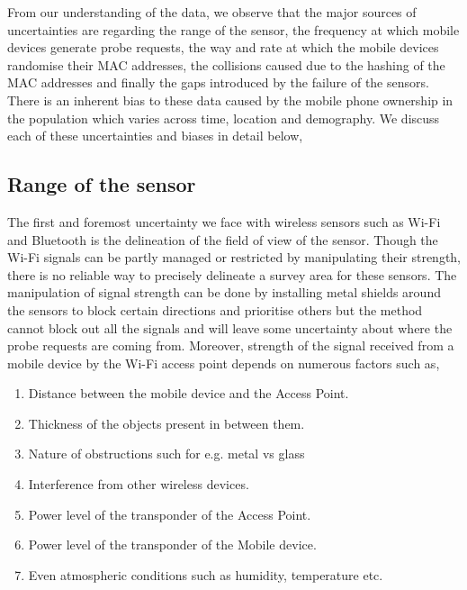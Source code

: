 From our understanding of the data, we observe that the major sources of uncertainties are regarding the range of the sensor, the frequency at which mobile devices generate probe requests, the way and rate at which the mobile devices randomise their MAC addresses, the collisions caused due to the hashing of the MAC addresses and finally the gaps introduced by the failure of the sensors.
There is an inherent bias to these data caused by the mobile phone ownership in the population which varies across time, location and demography.
We discuss each of these uncertainties and biases in detail below,

\subsection{Range of the sensor}
The first and foremost uncertainty we face with wireless sensors such as Wi-Fi and Bluetooth is the delineation of the field of view of the sensor.
Though the Wi-Fi signals can be partly managed or restricted by manipulating their strength, there is no reliable way to precisely delineate a survey area for these sensors. 
The manipulation of signal strength can be done by installing metal shields around the sensors to block certain directions and prioritise others but the method cannot block out all the signals and will leave some uncertainty about where the probe requests are coming from.
Moreover, strength of the signal received from a mobile device by the Wi-Fi access point depends on numerous factors such as,

\begin{enumerate}
  \setlength{\itemindent}{2em}
  \itemsep-0.5em
  \item Distance between the mobile device and the Access Point.
  \item Thickness of the objects present in between them.
  \item Nature of obstructions such for e.g. metal vs glass
  \item Interference from other wireless devices.
  \item Power level of the transponder of the Access Point.
  \item Power level of the transponder of the Mobile device.
  \item Even atmospheric conditions such as humidity, temperature etc.
\end{enumerate}

